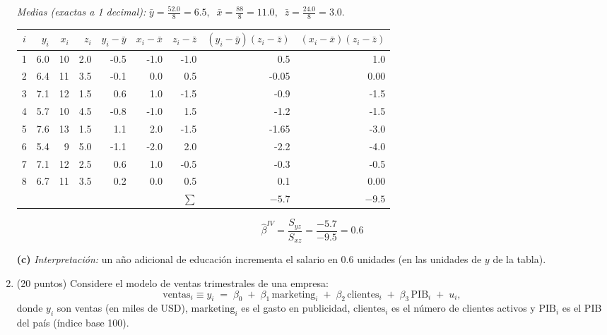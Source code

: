 \documentclass[10pt,a4paper]{article}
\begin{document}
\begin{enumerate}
\textit{Medias (exactas a 1 decimal):}\quad
\(\displaystyle \bar y=\frac{52.0}{8}=6.5,\;\; \bar x=\frac{88}{8}=11.0,\;\; \bar z=\frac{24.0}{8}=3.0.\)

\begin{center}
\small
\begin{tabular}{|c|r|r|r|r|r|r|r|r|}
\hline
\(i\) & \(y_i\) & \(x_i\) & \(z_i\) & \(y_i-\bar y\) & \(x_i-\bar x\) & \(z_i-\bar z\) & \((y_i-\bar y)(z_i-\bar z)\) & \((x_i-\bar x)(z_i-\bar z)\) \\
\hline
1 & 6.0 & 10 & 2.0 & -0.5 & -1.0 & -1.0 & \phantom{-}0.5 & \phantom{-}1.0 \\
2 & 6.4 & 11 & 3.5 & -0.1 & \phantom{-}0.0 & \phantom{-}0.5 & -0.05 & \phantom{-}0.00 \\
3 & 7.1 & 12 & 1.5 & \phantom{-}0.6 & \phantom{-}1.0 & -1.5 & -0.9 & -1.5 \\
4 & 5.7 & 10 & 4.5 & -0.8 & -1.0 & \phantom{-}1.5 & -1.2 & -1.5 \\
5 & 7.6 & 13 & 1.5 & \phantom{-}1.1 & \phantom{-}2.0 & -1.5 & -1.65 & -3.0 \\
6 & 5.4 &  9 & 5.0 & -1.1 & -2.0 & \phantom{-}2.0 & -2.2 & -4.0 \\
7 & 7.1 & 12 & 2.5 & \phantom{-}0.6 & \phantom{-}1.0 & -0.5 & -0.3 & -0.5 \\
8 & 6.7 & 11 & 3.5 & \phantom{-}0.2 & \phantom{-}0.0 & \phantom{-}0.5 & \phantom{-}0.1 & \phantom{-}0.00 \\
\hline
\multicolumn{7}{|r|}{\(\sum\)} & \(-5.7\) & \(-9.5\) \\
\hline
\end{tabular}
\end{center}

\[
\boxed{\;\hat\beta^{IV}=\frac{S_{yz}}{S_{xz}}=\frac{-5.7}{-9.5}=0.6\;}
\]

\medskip
\textbf{(c)} \textit{Interpretación:} un año adicional de educación incrementa el salario en \(0.6\) unidades (en las unidades de \(y\) de la tabla).





      \color{black}  
    \item (20 puntos) Considere el modelo de ventas trimestrales de una empresa:
\[
\text{ventas}_i \equiv y_i \;=\; \beta_0 \;+\; \beta_1\,\text{marketing}_i \;+\; \beta_2\,\text{clientes}_i \;+\; \beta_3\,\text{PIB}_i \;+\; u_i,
\]
donde \(y_i\) son ventas (en miles de USD), \(\text{marketing}_i\) es el gasto en publicidad,
\(\text{clientes}_i\) es el número de clientes activos y \(\text{PIB}_i\) es el PIB del país (índice base 100).


\end{enumerate}
\end{document}
